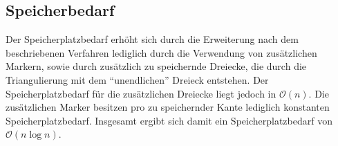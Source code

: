 \documentclass[a4paper]{article}
\begin{document}
\subsection*{Speicherbedarf}

Der Speicherplatzbedarf erhöht sich durch die Erweiterung nach dem beschriebenen Verfahren lediglich durch die Verwendung von zusätzlichen Markern, 
sowie durch zusätzlich zu speichernde Dreiecke, die durch die Triangulierung mit dem "`unendlichen"' Dreieck entstehen. Der Speicherplatzbedarf
für die zusätzlichen Dreiecke liegt jedoch in $\mathcal{O}(n)$. Die zusätzlichen Marker besitzen pro zu speichernder Kante lediglich konstanten Speicherplatzbedarf. 
Insgesamt ergibt sich damit ein Speicherplatzbedarf von $\mathcal{O}(n \log n)$.
\end{document}
